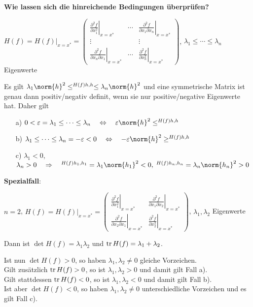 \linie

\textbf{Wie lassen sich die hinreichende Bedingungen überprüfen?}

$H(f) = \left.H(f)\right|_{x=x^\ast} = \begin{pmatrix}
\left.\frac{\partial^2 f}{\partial x_1^2}\right|_{x=x^\ast} &
\cdots &
\left.\frac{\partial^2 f}{\partial x_1 \partial x_n}\right|_{x=x^\ast} \\
\vdots & & \vdots \\
\left.\frac{\partial^2 f}{\partial x_n \partial x_1}\right|_{x=x^\ast} &
\cdots &
\left.\frac{\partial^2 f}{\partial x_n^2}\right|_{x=x^\ast}
\end{pmatrix}$,
$\lambda_1 \le \dotsb \le \lambda_n$ Eigenwerte

Es gilt $\lambda_1 \norm{h}^2 \le \sp{H(f)h, h} \le \lambda_n \norm{h}^2$
und eine symmetrische Matrix ist genau dann positiv/negativ definit, wenn
sie nur positive/negative Eigenwerte hat.
Daher gilt
\begin{itemize}
    \item[a)]
    $0 < \varepsilon = \lambda_1 \le \dotsb \le \lambda_n
    \quad\Leftrightarrow\quad \varepsilon \norm{h}^2 \le \sp{H(f)h, h}$

    \item[b)]
    $\lambda_1 \le \dotsb \le \lambda_n = -\varepsilon < 0
    \quad\Leftrightarrow\quad -\varepsilon \norm{h}^2 \ge \sp{H(f)h, h}$

    \item[c)]
    $\lambda_1 < 0$, $\lambda_n > 0
    \quad\Rightarrow\quad \sp{H(f)h_1, h_1} = \lambda_1 \norm{h_1}^2 < 0,\;
    \sp{H(f)h_n, h_n} = \lambda_n \norm{h_n}^2 > 0$
\end{itemize}

\linie

\textbf{Spezialfall}:

$n = 2$, $H(f) = \left.H(f)\right|_{x=x^\ast} = \begin{pmatrix}
\left.\frac{\partial^2 f}{\partial x_1^2}\right|_{x=x^\ast} &
\left.\frac{\partial^2 f}{\partial x_1 \partial x_2}\right|_{x=x^\ast} \\
\left.\frac{\partial^2 f}{\partial x_2 \partial x_1}\right|_{x=x^\ast} &
\left.\frac{\partial^2 f}{\partial x_2^2}\right|_{x=x^\ast}
\end{pmatrix}$,
$\lambda_1, \lambda_2$ Eigenwerte

Dann ist $\det H(f) = \lambda_1 \lambda_2$ und
$\operatorname{tr} H(f) = \lambda_1 + \lambda_2$.

Ist nun $\det H(f) > 0$, so haben $\lambda_1, \lambda_2 \not= 0$
gleiche Vorzeichen. \\
Gilt zusätzlich $\operatorname{tr} H(f) > 0$, so ist $\lambda_1, \lambda_2 > 0$ und damit
gilt Fall a). \\
Gilt stattdessen $\operatorname{tr} H(f) < 0$, so ist $\lambda_1, \lambda_2 < 0$ und damit
gilt Fall b). \\
Ist aber $\det H(f) < 0$, so haben $\lambda_1, \lambda_2 \not= 0$
unterschiedliche Vorzeichen und es gilt Fall c).


